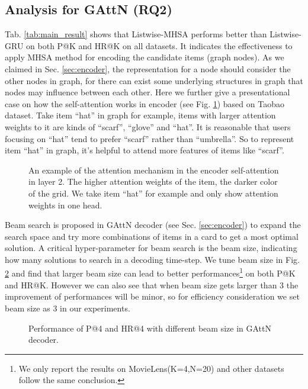 \subsection{Analysis for GAttN (RQ2)}
Tab. \ref{tab:main_result} shows that Listwise-MHSA performs better than Listwise-GRU
on both P@K and HR@K on all datasets.
It indicates the effectiveness to apply MHSA method for encoding the candidate items (graph nodes).
As we claimed in Sec. \ref{sec:encoder}, 
the representation for a node should consider the other nodes in graph, 
for there can exist some underlying structures in graph that nodes may influence between each other.
Here we further give a presentational case on how the self-attention works in encoder (see Fig. \ref{fig:attention}) based on Taobao dataset.
Take item ``hat'' in graph for example, items with larger attention weights to it are kinds of ``scarf'', ``glove'' and ``hat''.
It is reasonable that users focusing on ``hat'' tend to prefer ``scarf'' rather than ``umbrella''.
So to represent item ``hat'' in graph, it's helpful to attend more features of items like ``scarf''.
\begin{figure}[th]
	\centering
	\caption{An example of the attention mechanism in the encoder self-attention in layer 2.
	The higher attention weights of the item, the darker color of the grid.
	We take item ``hat'' for example and only show attention weights in one head.}
	\label{fig:attention}
\end{figure}

Beam search is proposed in GAttN decoder (see Sec. \ref{sec:encoder}) to expand the search space and try more combinations of items in a card to get a most optimal solution.
A critical hyper-parameter for beam search is the beam size, indicating how many solutions to search in a decoding time-step.
We tune beam size in Fig. \ref{fig:beam_search} and find that larger beam size can lead to better performances\footnote{We only report the results on MovieLens(K=4,N=20) and other datasets follow the same conclusion.} on both P@K and HR@K.
However we can also see that when beam size gets larger than 3 the improvement of performances will be minor,
so for efficiency consideration we set beam size as 3 in our experiments.
\begin{figure}[th]
	\centering
	\caption{Performance of P@4 and HR@4 with different beam size in GAttN decoder.}
	\label{fig:beam_search}
\end{figure}

